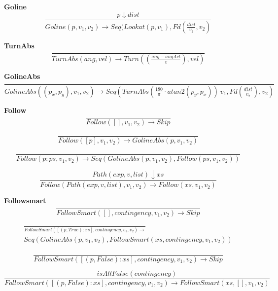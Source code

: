\documentclass[11pt]{scrartcl}
\begin{document}
\textbf{Goline}
\[
 \frac{p \downarrow dist}{Goline (p,v_1,v_2) \to Seq( Lookat(p, v_1) , Fd (\frac{dist}{v_2}, v_2)}
\]

\textbf{TurnAbs}
\[
 \frac{}{TurnAbs(ang, vel) \to Turn\left(\left(\frac{ang - angAct}{v}\right), vel\right)}
\]

\textbf{GolineAbs}
\[
 \frac{}{ GolineAbs((p_x,p_y), v_1, v_2) \to Seq (TurnAbs \left(\frac{180}{\pi} \cdot atan2 (p_y, p_x)\right) \ v_1, Fd(\frac{dist}{v_2}), v_2)}
\]

\textbf{Follow}
\begin{equation}
\frac{}{Follow([], v_1, v_2) \to Skip}
\end{equation}
    
\begin{equation}
\frac{}{Follow([p], v_1, v_2) \to GolineAbs(p, v_1, v_2)}
\end{equation}
    
\begin{equation}
    \frac{}{Follow(p:ps, v_1, v_2) \to {Seq(GolineAbs(p, v_1, v_2), Follow(ps, v_1, v_2))}}
   \end{equation}

   \begin{equation}
    \frac{Path (exp,v, list) \downarrow xs}{Follow(Path (exp,v, list), v_1, v_2) \to {Follow(xs, v_1, v_2)}}
   \end{equation}

\textbf{Followsmart}
\setcounter{equation}{0}
\begin{equation}
    \frac{}{FollowSmart([], contingency, v_1, v_2) \to Skip}
    \end{equation}
    
    \begin{equation}
        \begin{split}
    \frac{}{FollowSmart([(p,True):xs], contingency, v_1, v_2) \to}\\
     Seq ( GolineAbs(p, v_1, v_2), FollowSmart(xs, contingency, v_1, v_2))
        \end{split}
    \end{equation}

\begin{equation}
\frac{}{FollowSmart([(p,False):xs], contingency, v_1, v_2) \to Skip}
\end{equation}

\begin{equation}
    \frac{isAllFalse(contingency)}{FollowSmart([(p,False):xs], contingency, v_1, v_2) \to FollowSmart(xs, [], v_1, v_2)}
    \end{equation}
\end{document}
